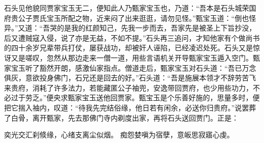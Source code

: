 \documentclass[12pt,oneside]{book}
\begin{document}
石头见他貌同贾家宝玉无二，便知此人乃甄家宝玉也，乃道：“吾本是石头城荣国府贵公子贾氏宝玉所配之物，近来闷了出来逛逛，请勿见怪。”甄宝玉道：“倒也怪异。”又道：“吾哭的是我的红颜知己，先我一步而去，吾家先是被圣上下旨抄没，后又遭贼寇入侵，说了亦是无益，不如不提。”石头再三追问，才知他家有个做尚书的四十余岁兄辈带兵打仗，屡获战功，却被奸人诬陷，已经凌迟处死。石头又是惊讶又是嗟叹，忽然从那边走来一僧一道，用些言语机关开导甄家宝玉遁入空门。甄家宝玉听了豁然开朗，感激仙家指点。僧道走后，甄家宝玉对石头道：“吾已万念俱灰，意欲投身佛门，石兄还是回去的好。”石头道：“吾是施展本领才不辞劳苦飞来贵府，消耗了许多法力，若能藏匿公子袖兜，安逸带回贾府，也少用些功力，不必过于劳乏。”便央求甄家宝玉送他回贾家。甄宝玉是个乐善好施的，思量多时，便把它揣入袖内，叹道：“待我先完结俗缘，他日若有闲余，必送你归贵府。”说罢葬了白骨，离开甄家，先去那佛门寺内剃度出家，再将石头送回贾门。正是：

奕光交汇刹倐缘，心绪支离尘似烟。
痴怨婪嗔为宿孽，意皈思寂寤心虔。
\end{document}
